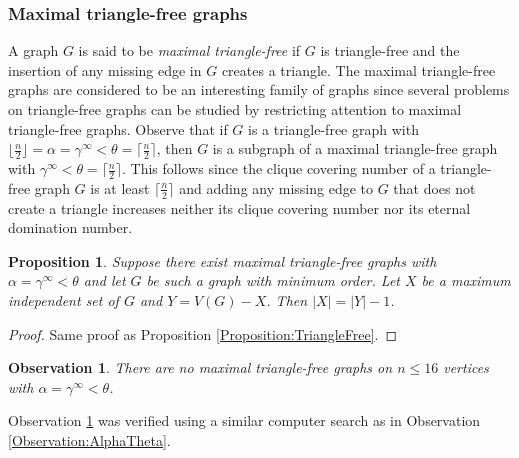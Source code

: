 \documentclass[11pt]{article}
\newtheorem{prop}[thm]{Proposition}
\newtheorem{obs}[thm]{Observation}
\begin{document}
	
	\newpage
	\subsubsection{Maximal triangle-free graphs} \label{Section:MaximalTriangleFree}
	
	A graph $G$ is said to be \textit{maximal triangle-free} if $G$ is triangle-free and the insertion of any missing edge in $G$ creates a triangle. The maximal triangle-free graphs are considered to be an interesting family of graphs since several problems on triangle-free graphs can be studied by restricting attention to maximal triangle-free graphs. Observe that if $G$ is a triangle-free graph with $\lfloor \frac{n}{2} \rfloor = \alpha = \gamma^\infty < \theta = \lceil \frac{n}{2} \rceil$, then $G$ is a subgraph of a maximal triangle-free graph with $\gamma^\infty < \theta = \lceil \frac{n}{2} \rceil$. This follows since the clique covering number of a triangle-free graph $G$ is at least $\lceil \frac{n}{2} \rceil$ and adding any missing edge to $G$ that does not create a triangle increases neither its clique covering number nor its eternal domination number.
	
	\begin{prop} \label{Proposition:MaximalTriangleFree}
		Suppose there exist maximal triangle-free graphs with $\alpha=\gamma^\infty<\theta$ and let $G$ be such a graph with minimum order. Let $X$ be a maximum independent set of $G$ and $Y=V(G)-X$. Then $|X|=|Y|-1$.
	\end{prop}

	\begin{proof}
		Same proof as Proposition \ref{Proposition:TriangleFree}.
	\end{proof}
	
	\begin{obs} \label{Observation:MTFalphaTheta}
		There are no maximal triangle-free graphs on $n \leq 16$ vertices with $\alpha=\gamma^\infty<\theta$.
	\end{obs}

	Observation \ref{Observation:MTFalphaTheta} was verified using a similar computer search as in Observation \ref{Observation:AlphaTheta}.
		
\end{document}
